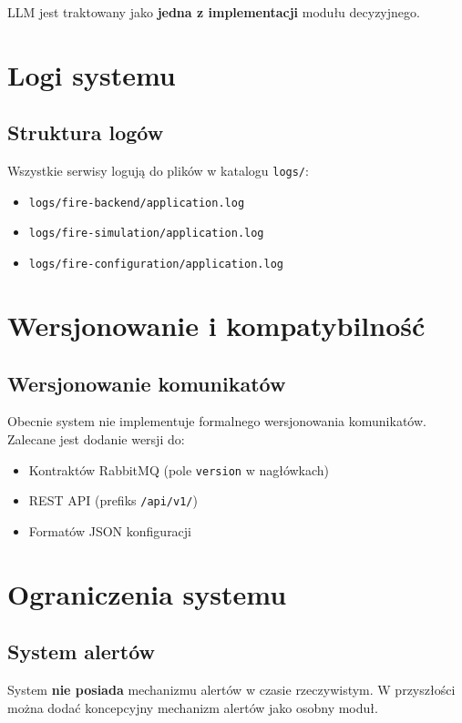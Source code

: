 LLM jest traktowany jako \textbf{jedna z implementacji} modułu decyzyjnego.

\section{Logi systemu}

\subsection{Struktura logów}

Wszystkie serwisy logują do plików w katalogu \texttt{logs/}:
\begin{itemize}
    \item \texttt{logs/fire-backend/application.log}
    \item \texttt{logs/fire-simulation/application.log}
    \item \texttt{logs/fire-configuration/application.log}
\end{itemize}

\section{Wersjonowanie i kompatybilność}

\subsection{Wersjonowanie komunikatów}

Obecnie system nie implementuje formalnego wersjonowania komunikatów. Zalecane jest dodanie wersji do:
\begin{itemize}
    \item Kontraktów RabbitMQ (pole \texttt{version} w nagłówkach)
    \item REST API (prefiks \texttt{/api/v1/})
    \item Formatów JSON konfiguracji
\end{itemize}

\section{Ograniczenia systemu}

\subsection{System alertów}

System \textbf{nie posiada} mechanizmu alertów w czasie rzeczywistym. W przyszłości można dodać koncepcyjny mechanizm alertów jako osobny moduł.

